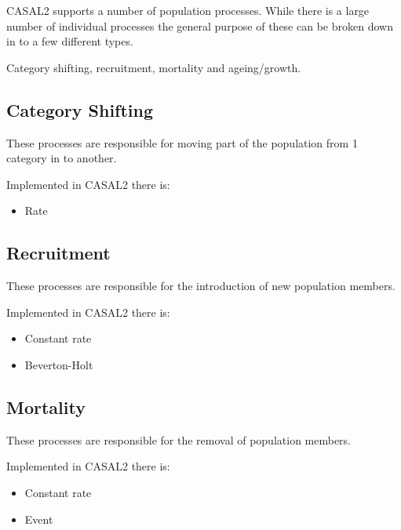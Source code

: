 \documentclass[a4paper,11pt,twoside,pdftex,draft]{article}
\providecommand{\tightlist}{%
  \setlength{\itemsep}{0pt}\setlength{\parskip}{0pt}}
\begin{document}
CASAL2 supports a number of population processes. While there is a large
number of individual processes the general purpose of these can be
broken down in to a few different types.

Category shifting, recruitment, mortality and ageing/growth.

\hypertarget{category-shifting}{%
\subsection[Category
Shifting]{\texorpdfstring{\protect\hypertarget{anchor-37}{}{}Category
Shifting}{Category Shifting}}\label{category-shifting}}

These processes are responsible for moving part of the population from 1
category in to another.

Implemented in CASAL2 there is:

\begin{itemize}
\tightlist
\item
  Rate
\end{itemize}

\hypertarget{recruitment}{%
\subsection[Recruitment]{\texorpdfstring{\protect\hypertarget{anchor-38}{}{}Recruitment}{Recruitment}}\label{recruitment}}

These processes are responsible for the introduction of new population
members.

Implemented in CASAL2 there is:

\begin{itemize}
\tightlist
\item
  Constant rate
\item
  Beverton-Holt
\end{itemize}

\hypertarget{mortality}{%
\subsection[Mortality]{\texorpdfstring{\protect\hypertarget{anchor-39}{}{}Mortality}{Mortality}}\label{mortality}}

These processes are responsible for the removal of population members.

Implemented in CASAL2 there is:

\begin{itemize}
\tightlist
\item
  Constant rate
\item
  Event
\end{itemize}
\end{document}
